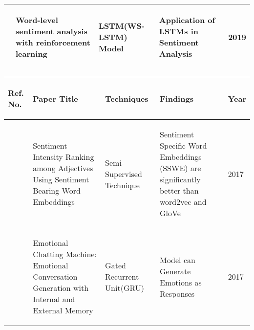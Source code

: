 \begin{tabularx}{\columnwidth}{|X|X|X|X|X|}
	\hline
	\begin{center}\cite{article5}\end{center} & \begin{center}Word-level sentiment analysis with reinforcement learning\end{center} & \begin{center}LSTM(WS-LSTM) Model\end{center} & \begin{center}Application of LSTMs in Sentiment Analysis\end{center} & \begin{center}2019\end{center}\\
	\hline
\end{tabularx}

\begin{tabularx}{\columnwidth}{|X|X|X|X|X|}
	\hline
	\begin{center}\textbf{Ref. No.}\end{center} & \begin{center}\textbf{Paper Title}\end{center} & \begin{center}\textbf{Techniques}\end{center} & \begin{center}\textbf{Findings}\end{center} & \begin{center}\textbf{Year}\end{center}\\
	\hline
	\begin{center}\cite{article7}\end{center} & \begin{center}Sentiment Intensity Ranking among Adjectives Using Sentiment Bearing Word Embeddings\end{center} & \begin{center}Semi-Supervised Technique\end{center} & \begin{center}Sentiment Specific Word Embeddings (SSWE) are significantly better than word2vec and GloVe\end{center} & \begin{center}2017\end{center}\\
	\hline
	\begin{center}\cite{article6}\end{center} & \begin{center}Emotional Chatting Machine: Emotional Conversation Generation with Internal and External Memory\end{center} & \begin{center}Gated Recurrent Unit(GRU)\end{center} & \begin{center}Model can Generate Emotions as Responses\end{center} & \begin{center}2017\end{center}\\

\end{tabularx}
